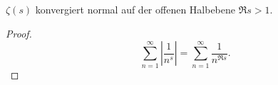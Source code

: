\begin{frame}
    \begin{lemma}[Konvergenzgebiet]
        $\zeta(s)$ konvergiert normal auf der offenen Halbebene $\Re s > 1$.
    \end{lemma}
    \begin{proof}
    \[\sum_{n=1}^\infty \left|\frac{1}{n^s}\right| = \sum_{n=1}^\infty \frac{1}{n^{\Re s}}.\] 
    \end{proof}

\end{frame}
